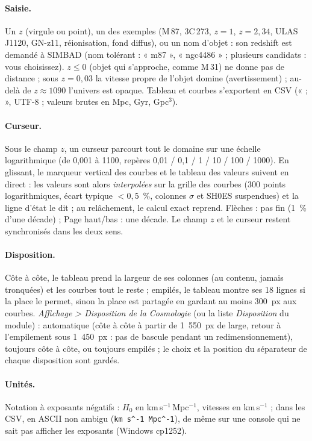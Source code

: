 \paragraph{Saisie.} Un $z$ (virgule ou point), un des exemples (M\,87, 3C\,273, $z = 1$, $z = 2{,}34$, ULAS J1120,
GN-z11, réionisation, fond diffus), ou un nom d'objet : son redshift est demandé à SIMBAD (nom tolérant :
« m87 », « ngc4486 » ; plusieurs candidats : vous choisissez). $z \le 0$ (objet qui s'approche, comme M\,31) ne donne
pas de distance ; sous $z = 0{,}03$ la vitesse propre de l'objet domine (avertissement) ; au-delà de $z \approx 1090$
l'univers est opaque. Tableau et courbes s'exportent en CSV (« ; », UTF-8 ; valeurs brutes en Mpc, Gyr, Gpc$^3$).

\paragraph{Curseur.} Sous le champ $z$, un curseur parcourt tout le domaine sur une échelle logarithmique
(de 0,001 à 1100, repères 0,01 / 0,1 / 1 / 10 / 100 / 1000). En glissant, le marqueur vertical des courbes et le
tableau des valeurs suivent en direct : les valeurs sont alors \emph{interpolées} sur la grille des courbes (300
points logarithmiques, écart typique $< 0{,}5$~\%, colonnes $\sigma$ et SH0ES suspendues) et la ligne d'état le dit ;
au relâchement, le calcul exact reprend. Flèches : pas fin (1~\% d'une décade) ; Page haut/bas : une décade. Le
champ $z$ et le curseur restent synchronisés dans les deux sens.

\paragraph{Disposition.} Côte à côte, le tableau prend la largeur de ses colonnes (au contenu, jamais tronquées) et
les courbes tout le reste ; empilés, le tableau montre ses 18 lignes si la place le permet, sinon la place est
partagée en gardant au moins 300~px aux courbes. \emph{Affichage > Disposition de la Cosmologie} (ou la liste
\emph{Disposition} du module) : automatique (côte à côte à partir de 1~550~px de large, retour à l'empilement sous
1~450~px : pas de bascule pendant un redimensionnement), toujours côte à côte, ou toujours empilés ; le choix et la
position du séparateur de chaque disposition sont gardés.

\paragraph{Unités.} Notation à exposants négatifs : $H_0$ en km\,s$^{-1}$\,Mpc$^{-1}$, vitesses en km\,s$^{-1}$ ;
dans les CSV, en ASCII non ambigu (\texttt{km s\^{}-1 Mpc\^{}-1}), de même sur une console qui ne sait pas afficher
les exposants (Windows cp1252).

